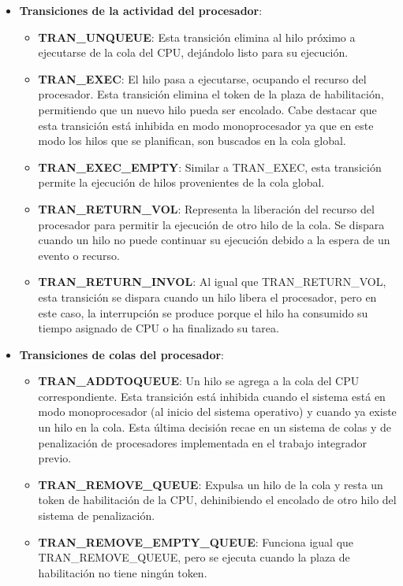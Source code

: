 \begin{itemize}
    \item \textbf{Transiciones de la actividad del procesador}:
        \begin{itemize}
            \item \textbf{TRAN\_UNQUEUE}: Esta transición elimina al hilo próximo a ejecutarse de la cola del CPU, dejándolo listo para su ejecución.
            \item \textbf{TRAN\_EXEC}: El hilo pasa a ejecutarse, ocupando el recurso del procesador. Esta transición elimina el token de la plaza de habilitación, permitiendo que un nuevo hilo pueda ser encolado. Cabe destacar que esta transición está inhibida en modo monoprocesador ya que en este modo los hilos que se planifican, son buscados en la cola global.
            \item \textbf{TRAN\_EXEC\_EMPTY}: Similar a TRAN\_EXEC, esta transición permite la ejecución de hilos provenientes de la cola global.
            \item \textbf{TRAN\_RETURN\_VOL}: Representa la liberación del recurso del procesador para permitir la ejecución de otro hilo de la cola. Se dispara cuando un hilo no puede continuar su ejecución debido a la espera de un evento o recurso.
            \item \textbf{TRAN\_RETURN\_INVOL}: Al igual que TRAN\_RETURN\_VOL, esta transición se dispara cuando un hilo libera el procesador, pero en este caso, la interrupción se produce porque el hilo ha consumido su tiempo asignado de CPU o ha finalizado su tarea.
        \end{itemize}
    \item \textbf{Transiciones de colas del procesador}:
        \begin{itemize}
            \item \textbf{TRAN\_ADDTOQUEUE}: Un hilo se agrega a la cola del CPU correspondiente. Esta transición está inhibida cuando el sistema está en modo monoprocesador (al inicio del sistema operativo) y cuando ya existe un hilo en la cola. Esta última decisión recae en un sistema de colas y de penalización de procesadores implementada en el trabajo integrador previo.
            \item \textbf{TRAN\_REMOVE\_QUEUE}: Expulsa un hilo de la cola y resta un token de habilitación de la CPU, dehinibiendo el encolado de otro hilo del sistema de penalización.
            \item \textbf{TRAN\_REMOVE\_EMPTY\_QUEUE}: Funciona igual que TRAN\_REMOVE\_QUEUE, pero se ejecuta cuando la plaza de habilitación no tiene ningún token.

\end{itemize}
\end{itemize}
